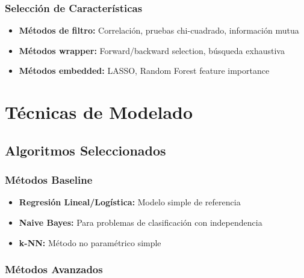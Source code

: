 \subsubsection{Selección de Características}

\begin{itemize}
    \item \textbf{Métodos de filtro:} Correlación, pruebas chi-cuadrado, información mutua
    \item \textbf{Métodos wrapper:} Forward/backward selection, búsqueda exhaustiva
    \item \textbf{Métodos embedded:} LASSO, Random Forest feature importance
\end{itemize}

\section{Técnicas de Modelado}

\subsection{Algoritmos Seleccionados}

\subsubsection{Métodos Baseline}

\begin{itemize}
    \item \textbf{Regresión Lineal/Logística:} Modelo simple de referencia
    \item \textbf{Naive Bayes:} Para problemas de clasificación con independencia
    \item \textbf{k-NN:} Método no paramétrico simple
\end{itemize}

\subsubsection{Métodos Avanzados}


